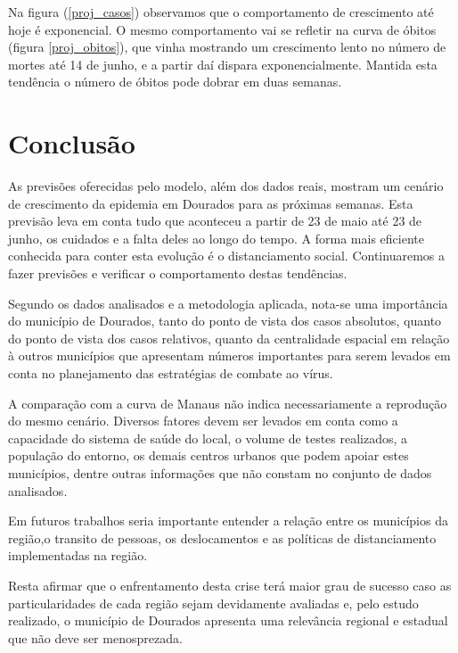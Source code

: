\documentclass[12pt]{article}
\begin{document}
Na figura (\ref{proj_casos}) observamos que o comportamento de crescimento até hoje é exponencial. O mesmo comportamento vai se refletir na curva de óbitos (figura \ref{proj_obitos}), que vinha mostrando um crescimento lento no número de mortes até 14 de junho, e a partir daí dispara exponencialmente. Mantida esta tendência o número de óbitos pode dobrar em duas semanas.   


     

\section{Conclusão}\label{conc}

As previsões oferecidas pelo modelo, além dos dados reais, mostram um cenário de crescimento da epidemia em Dourados para as próximas semanas. Esta previsão leva em conta tudo que aconteceu a partir de 23 de maio até 23 de junho, os cuidados e a falta deles ao longo do tempo. A forma mais eficiente conhecida para conter esta evolução é o distanciamento social. Continuaremos a fazer previsões e verificar o comportamento destas tendências.  


Segundo os dados analisados e a metodologia aplicada, nota-se uma importância do município de Dourados, tanto do ponto de vista dos casos absolutos, quanto do ponto de vista dos casos relativos, quanto da centralidade espacial em relação à outros municípios que apresentam números importantes para serem levados em conta no planejamento das estratégias de combate ao vírus.

A comparação com a curva de Manaus não indica necessariamente a reprodução do mesmo cenário. Diversos fatores devem ser levados em conta como a capacidade do sistema de saúde do local, o volume de testes realizados, a população do entorno, os demais centros urbanos que podem apoiar estes municípios, dentre outras informações que não constam no conjunto de dados analisados.

Em futuros trabalhos seria importante entender a relação entre os municípios da região,o transito de pessoas, os deslocamentos e as políticas de distanciamento implementadas na região.

Resta afirmar que o enfrentamento desta crise terá maior grau de sucesso caso as particularidades de cada região sejam devidamente avaliadas e, pelo estudo realizado, o município de Dourados apresenta uma relevância regional e estadual que não deve ser menosprezada.



\end{document}
